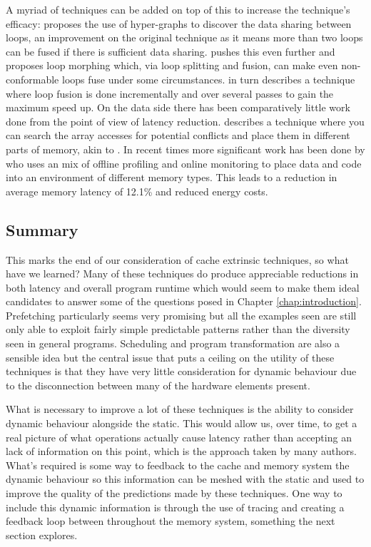 A myriad of techniques can be added on top of this to increase the technique's efficacy: \citet{dingMemoryBandwidthBottleneck2000} proposes the use of hyper-graphs to discover the data sharing between loops, an improvement on the original technique as it means more than two loops can be fused if there is sufficient data sharing. \citet{gomezOptimizingMemoryBandwidth2004} pushes this even further and proposes loop morphing which, via loop splitting and fusion, can make even non-conformable loops fuse under some circumstances. \citet{marchalOptimizingMemoryBandwidth2004} in turn describes a technique where loop fusion is done incrementally and over several passes to gain the maximum speed up. On the data side there has been comparatively little work done from the point of view of latency reduction. \citet{qaziOptimizationAccessLatency2016} describes a technique where you can search the array accesses for potential conflicts and place them in different parts of memory, akin to \citet{pandaMemoryDataOrganization1997}. In recent times more significant work has been done by \citet{weiExploitingProgramSemantics2015} who uses an mix of offline profiling and online monitoring to place data and code into an environment of different memory types. This leads to a reduction in average memory latency of 12.1\% and reduced energy costs.

\subsection{Summary}

This marks the end of our consideration of cache extrinsic techniques, so what have we learned? Many of these techniques do produce appreciable reductions in both latency and overall program runtime which would seem to make them ideal candidates to answer some of the questions posed in Chapter \ref{chap:introduction}.  Prefetching particularly seems very promising but all the examples seen are still only able to exploit fairly simple predictable patterns rather than the diversity seen in general programs. Scheduling and program transformation are also a sensible idea but the central issue that puts a ceiling on the utility of these techniques is that they have very little consideration for dynamic behaviour due to the disconnection between many of the hardware elements present. 
 
What is necessary to improve a lot of these techniques is the ability to consider dynamic behaviour alongside the static. This would allow us, over time, to get a real picture of what operations actually cause latency rather than accepting an lack of information on this point, which is the approach taken by many authors. What's required is some way to feedback to the cache and memory system the dynamic behaviour so this information can be meshed with the static and used to improve the quality of the predictions made by these techniques. One way to include this dynamic information is through the use of tracing and creating a feedback loop between throughout the memory system, something the next section explores.

